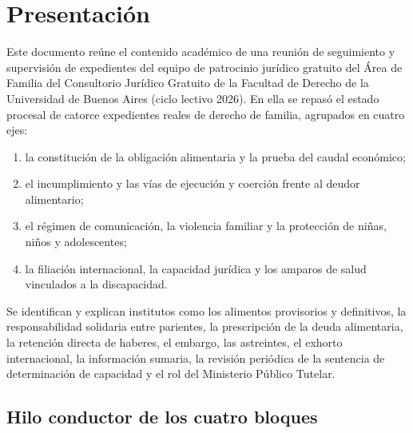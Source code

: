 \documentclass[12pt,oneside]{book}
\begin{document}
\tableofcontents

\mainmatter

\chapter*{Presentación}

Este documento reúne el contenido académico de una reunión de seguimiento y supervisión de expedientes del equipo de patrocinio jurídico gratuito del Área de Familia del Consultorio Jurídico Gratuito de la Facultad de Derecho de la Universidad de Buenos Aires (ciclo lectivo 2026). En ella se repasó el estado procesal de catorce expedientes reales de derecho de familia, agrupados en cuatro ejes:

\begin{enumerate}
    \item la constitución de la obligación alimentaria y la prueba del caudal económico;
    \item el incumplimiento y las vías de ejecución y coerción frente al deudor alimentario;
    \item el régimen de comunicación, la violencia familiar y la protección de niñas, niños y adolescentes;
    \item la filiación internacional, la capacidad jurídica y los amparos de salud vinculados a la discapacidad.
\end{enumerate}

Se identifican y explican institutos como los alimentos provisorios y definitivos, la responsabilidad solidaria entre parientes, la prescripción de la deuda alimentaria, la retención directa de haberes, el embargo, las astreintes, el exhorto internacional, la información sumaria, la revisión periódica de la sentencia de determinación de capacidad y el rol del Ministerio Público Tutelar.

\section*{Hilo conductor de los cuatro bloques}
\end{document}

